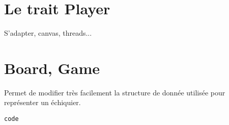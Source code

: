 \documentclass[11pt]{article}
\begin{document}
\section{Le trait Player}
S'adapter, canvas, threads...

\section{Board, Game}
Permet de modifier très facilement la structure de donnée utilisée pour représenter un échiquier.

\begin{lstlisting}
code
\end{lstlisting}
\end{document}
